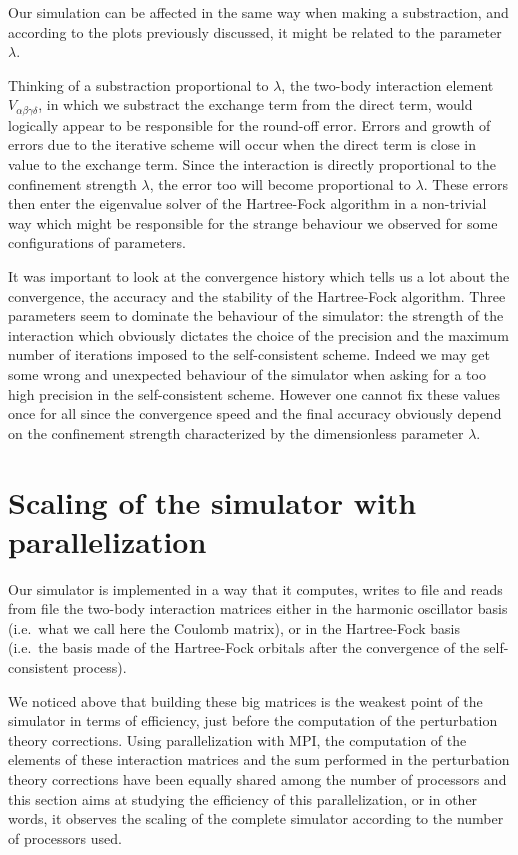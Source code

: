 Our simulation can be affected in the same way when making a substraction, and according to the plots previously discussed, it might be related to the parameter $\lambda$.

Thinking of a substraction proportional to $\lambda$, the two-body interaction element $V_{\alpha \beta \gamma \delta}$, in which we substract the exchange term from the direct term, would logically appear to be responsible for the round-off error. Errors and growth of errors due to the iterative scheme will occur when the direct term is close in value to the exchange term. Since the interaction is directly proportional to the confinement strength $\lambda$, the error too will become proportional to $\lambda$. These errors then enter the eigenvalue solver of the Hartree-Fock algorithm in a non-trivial way which might be responsible for the strange behaviour we observed for some configurations of parameters.

It was important to look at the convergence history which tells us a lot about the convergence, the accuracy and the stability of the Hartree-Fock algorithm. Three parameters seem to dominate the behaviour of the simulator: the strength of the interaction which obviously dictates the choice of the precision and the maximum number of iterations  imposed to the self-consistent scheme. Indeed we may get some wrong and unexpected behaviour of the simulator when asking for a too high precision in the self-consistent scheme. However one cannot fix these values once for all since the convergence speed and the final accuracy obviously depend on the confinement strength characterized by the dimensionless parameter $\lambda$.


\section{Scaling of the simulator with parallelization}
\label{sec:MPI}
Our simulator is implemented in a way that it computes, writes to file and reads from file the two-body interaction matrices either in the harmonic oscillator basis (i.e.\ what we call here the Coulomb matrix), or in the Hartree-Fock basis (i.e.\ the basis made of the Hartree-Fock orbitals after the convergence of the self-consistent process).

We noticed above that building these big matrices is the weakest point of the simulator in terms of efficiency, just before the computation of the perturbation theory corrections. Using parallelization with MPI, the computation of the elements of these interaction matrices and the sum performed in the perturbation theory corrections have been equally shared among the number of processors and this section aims at studying the efficiency of this parallelization, or in other words, it observes the scaling of the complete simulator according to the number of processors used.

